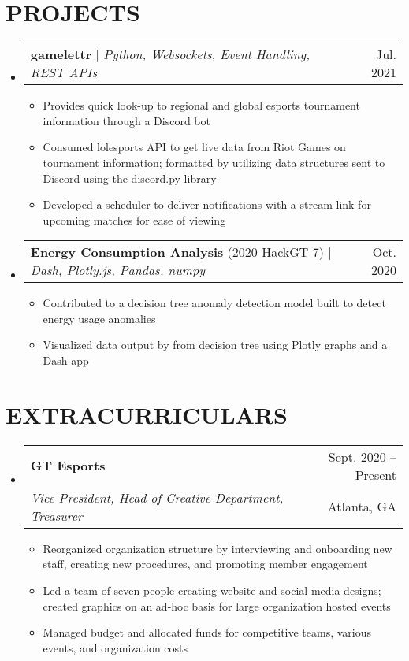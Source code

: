\documentclass[letterpaper,12pt]{extarticle}
\makeatletter
\newcommand{\resumeItem}[1]{
  \item\small{
    {#1 \vspace{-1pt}}
  }
}
\newcommand{\resumeSubheading}[4]{
  \vspace{-1pt}\item
    \begin{tabular*}{\textwidth}[t]{l@{\extracolsep{\fill}}r}
      \textbf{#1} & {\color{dark-grey}\small #2}\vspace{1pt}\\ %
      \textit{#3} & {\color{dark-grey} \small #4}\\ %
    \end{tabular*}\vspace{-4pt}
}
\newcommand{\resumeProjectHeading}[2]{
    \item
    \begin{tabular*}{0.97\textwidth}{l@{\extracolsep{\fill}}r}
      \small#1 & \small#2 \\
    \end{tabular*}\vspace{-7pt}
}
\newcommand{\resumeSubHeadingListStart}{\begin{itemize}[leftmargin=0in, label={}]}
\newcommand{\resumeSubHeadingListEnd}{\end{itemize}}
\newcommand{\resumeItemListStart}{\begin{itemize}}
\newcommand{\resumeItemListEnd}{\end{itemize}\vspace{0pt}}
\makeatother
\begin{document}
\section{PROJECTS}
    \resumeSubHeadingListStart
      \resumeProjectHeading
          {\textbf{gamelettr} $|$ \emph{Python, Websockets, Event Handling, REST APIs}}{Jul. 2021}
        \resumeItemListStart
            \resumeItem{
                Provides quick look-up to regional and global esports
                tournament information through a Discord bot
            }
            \resumeItem{
                Consumed lolesports API to get live data from Riot Games on tournament information; formatted by utilizing data structures sent to Discord using the discord.py library
            }
            \resumeItem{
                Developed a scheduler to deliver notifications with a stream link for upcoming matches for ease of viewing
            }
        \resumeItemListEnd
        \vspace{-3mm}
        \resumeProjectHeading
        {\textbf{Energy Consumption Analysis} (2020 HackGT 7) $|$ \emph{Dash, Plotly.js, Pandas, numpy}}{Oct. 2020}
        \resumeItemListStart
            \resumeItem{
                Contributed to a decision tree anomaly detection model
                built to detect energy usage anomalies
            }
            \resumeItem{
                Visualized data output by from decision tree using Plotly graphs and a Dash app
            }
        \resumeItemListEnd
        
    \resumeSubHeadingListEnd

\vspace{-6mm}
\section{EXTRACURRICULARS}
  \resumeSubHeadingListStart
    \resumeSubheading
    {GT Esports}{Sept. 2020 -- Present}
    {Vice President, Head of Creative Department, Treasurer}{Atlanta, GA}
    \resumeItemListStart
        \resumeItem{
            Reorganized organization structure by interviewing and onboarding new staff, creating new procedures, and promoting member engagement}
        \resumeItem{
            Led a team of seven people creating website and social media designs; created graphics on an ad-hoc basis for large organization hosted events}
         \resumeItem{Managed budget and allocated funds for competitive teams, various events, and organization costs}
    \resumeItemListEnd

  \resumeSubHeadingListEnd
  
\end{document}
